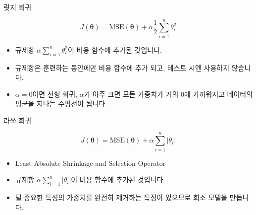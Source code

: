 \documentclass{beamer}
\numberwithin{equation}{section}
\begin{document}

\begin{frame}{릿지 회귀}

\begin{equation}
J(\boldsymbol{\theta}) = \text{MSE}(\boldsymbol{\theta}) + \alpha \dfrac{1}{2}\sum\limits_{i=1}^{n}\theta_i^2
\end{equation}

\vskip 0.5cm

\begin{itemize}
\item 규제항 $\alpha \sum_{i=1}^{n}\theta_{i}^{2}$이 비용 함수에 추가된 것입니다.
\vskip 0.25cm
\item 규제항은 훈련하는 동안에만 비용 함수에 추가 되고, 테스트 시엔 사용하지 않습니다.
\vskip 0.25cm
\item $\alpha=0$이면 선형 회귀, $\alpha$가 아주 크면 모든 가중치가 거의 0에 가까워지고 데이터의 평균을 지나는 수평선이 됩니다.
\end{itemize}

\end{frame}


\begin{frame}{라쏘 회귀}

\begin{equation}
J(\boldsymbol{\theta}) = \text{MSE}(\boldsymbol{\theta}) + \alpha \sum\limits_{i=1}^{n}\left| \theta_i \right|
\end{equation}

\vskip 0.5cm

\begin{itemize}
\item Least Absolute Shrinkage and Selection Operator
\vskip 0.25cm
\item 규제항 $\alpha \sum_{i=1}^{n}\left|\theta_{i} \right|$이 비용 함수에 추가된 것입니다.
\vskip 0.25cm
\item 덜 중요한 특성의 가중치를 완전히 제거하는 특징이 있으므로 희소 모델을 만듭니다.
\end{itemize}

\end{frame}

\end{document}
